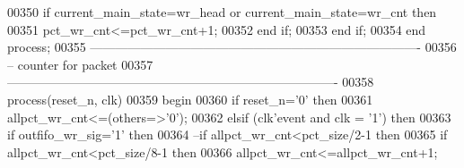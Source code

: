 \begin{DoxyCode}
00350           \textcolor{keywordflow}{if} \textcolor{vhdlchar}{current_main_state}\textcolor{vhdlchar}{=}\textcolor{vhdlchar}{wr\_head} \textcolor{keywordflow}{or} \textcolor{vhdlchar}{current_main_state}\textcolor{vhdlchar}{=}\textcolor{vhdlchar}{wr\_cnt} \textcolor{keywordflow}{then} 
00351             \textcolor{vhdlchar}{pct_wr_cnt}\textcolor{vhdlchar}{<=}\textcolor{vhdlchar}{pct_wr_cnt}\textcolor{vhdlchar}{+}\textcolor{vhdllogic}{}\textcolor{vhdllogic}{1};
00352           \textcolor{keywordflow}{end} \textcolor{keywordflow}{if};
00353         \textcolor{keywordflow}{end} \textcolor{keywordflow}{if};
00354     \textcolor{keywordflow}{end} \textcolor{keywordflow}{process};
00355 \textcolor{keyword}{ -------------------------------------------------------------------------------}
00356 \textcolor{keyword}{-- counter for packet}
00357 \textcolor{keyword}{-------------------------------------------------------------------------------   }
00358       \textcolor{keywordflow}{process}(reset_n, clk)
00359 \textcolor{vhdlkeyword}{    begin}
00360       \textcolor{keywordflow}{if} \textcolor{vhdlchar}{reset_n}\textcolor{vhdlchar}{=}\textcolor{vhdlchar}{'}\textcolor{vhdllogic}{}\textcolor{vhdllogic}{0}\textcolor{vhdlchar}{'} \textcolor{keywordflow}{then}
00361           \textcolor{vhdlchar}{allpct_wr_cnt}\textcolor{vhdlchar}{<=}\textcolor{vhdlchar}{(}\textcolor{keywordflow}{others}\textcolor{vhdlchar}{=}\textcolor{vhdlchar}{>}\textcolor{vhdlchar}{'}\textcolor{vhdllogic}{}\textcolor{vhdllogic}{0}\textcolor{vhdlchar}{'}\textcolor{vhdlchar}{)};
00362         \textcolor{keywordflow}{elsif} \textcolor{vhdlchar}{(}\textcolor{vhdlchar}{clk}\textcolor{vhdlchar}{'}\textcolor{vhdlkeyword}{event} \textcolor{keywordflow}{and} \textcolor{vhdlchar}{clk} \textcolor{vhdlchar}{=} \textcolor{vhdlchar}{'}\textcolor{vhdllogic}{}\textcolor{vhdllogic}{1}\textcolor{vhdlchar}{'}\textcolor{vhdlchar}{)} \textcolor{keywordflow}{then}
00363           \textcolor{keywordflow}{if} \textcolor{vhdlchar}{outfifo_wr_sig}\textcolor{vhdlchar}{=}\textcolor{vhdlchar}{'}\textcolor{vhdllogic}{}\textcolor{vhdllogic}{1}\textcolor{vhdlchar}{'} \textcolor{keywordflow}{then}
00364 \textcolor{keyword}{            --if allpct\_wr\_cnt<pct\_size/2-1 then }
00365                 \textcolor{keywordflow}{if} \textcolor{vhdlchar}{allpct_wr_cnt}\textcolor{vhdlchar}{<}\textcolor{vhdlchar}{pct_size}\textcolor{vhdlchar}{/}\textcolor{vhdllogic}{8-1} \textcolor{keywordflow}{then}
00366               \textcolor{vhdlchar}{allpct_wr_cnt}\textcolor{vhdlchar}{<=}\textcolor{vhdlchar}{allpct_wr_cnt}\textcolor{vhdlchar}{+}\textcolor{vhdllogic}{}\textcolor{vhdllogic}{1};

\end{DoxyCode}
